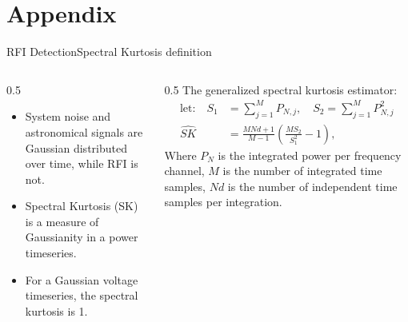 \documentclass[aspectratio=169,t]{beamer}
\begin{document}
\section{Appendix}
\begin{frame}{RFI Detection}{Spectral Kurtosis definition}
  \begin{columns}[T]
    \begin{column}{0.5\linewidth}
      \begin{itemize}
        \item System noise and astronomical signals are Gaussian distributed over time, while RFI is not.
        \item Spectral Kurtosis (SK) \citep{nitaGeneralizedSpectralKurtosis2010} is a measure of Gaussianity in a power timeseries.
        \item For a Gaussian voltage timeseries, the spectral kurtosis is 1.
      \end{itemize}
    \end{column}
    \begin{column}{0.5\linewidth}
      \centering
      {The generalized spectral kurtosis estimator:}
      \begin{align*}
          \text{let:} \quad S_1 &= \sum_{j=1}^{M} P_{N,j}, \quad S_2 = \sum_{j=1}^{M} P_{N,j}^2 \\[4pt]
          \widehat{SK} &= \frac{M N d + 1}{M - 1} \left( \frac{M S_2}{S_1^2} - 1 \right),
      \end{align*}
      {\footnotesize Where $P_{N}$ is the integrated power per frequency channel, $M$ is the number of integrated time samples, $Nd$ is the number of independent time samples per integration.}
    \end{column}
  \end{columns}
\end{frame}
\end{document}
